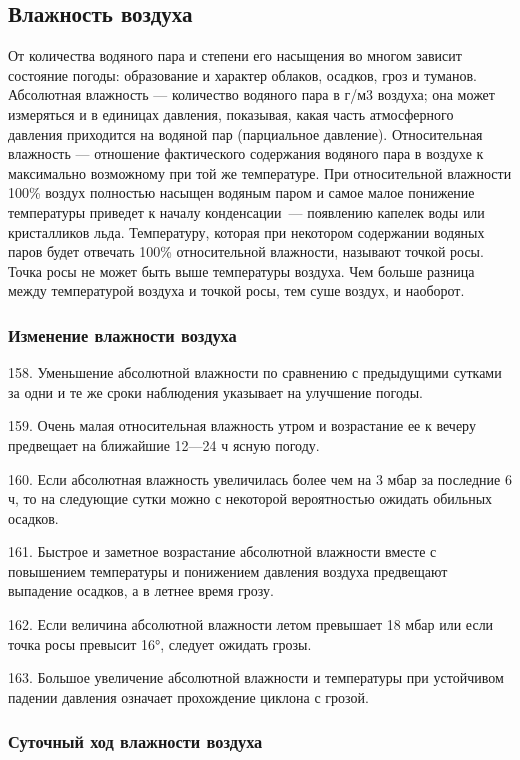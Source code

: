 \subsection{Влажность воздуха}

От количества водяного пара и степени его насыщения во многом зависит состояние погоды: образование и характер облаков, осадков, гроз и туманов. Абсолютная влажность — количество водяного пара в г/м3 воздуха; она может измеряться и в единицах давления, показывая, какая часть атмосферного давления приходится на водяной пар (парциальное давление). Относительная влажность — отношение фактического содержания водяного пара в воздухе к максимально возможному при той же температуре. При относительной влажности 100\% воздух полностью насыщен водяным паром и самое малое понижение температуры приведет к началу конденсации~--- появлению капелек воды или кристалликов льда. Температуру, которая при некотором содержании водяных паров будет отвечать 100\% относительной влажности, называют точкой росы. Точка росы не может быть выше температуры воздуха. Чем больше разница между температурой воздуха и точкой росы, тем суше воздух, и наоборот.

\subsubsection{Изменение влажности воздуха}

158. Уменьшение абсолютной влажности по сравнению с предыдущими сутками за одни и те же сроки наблюдения указывает на улучшение погоды.

159. Очень малая относительная влажность утром и возрастание ее к вечеру предвещает на ближайшие 12—24 ч ясную погоду.

160. Если абсолютная влажность увеличилась более чем на 3 мбар за последние 6 ч, то на следующие сутки можно с некоторой вероятностью ожидать обильных осадков.

161. Быстрое и заметное возрастание абсолютной влажности вместе с повышением температуры и понижением давления воздуха предвещают выпадение осадков, а в летнее время грозу.

162. Если величина абсолютной влажности летом превышает 18 мбар или если точка росы превысит 16°, следует ожидать грозы.

163. Большое увеличение абсолютной влажности и температуры при устойчивом падении давления означает прохождение циклона с грозой.

\subsubsection{Суточный ход влажности воздуха}

